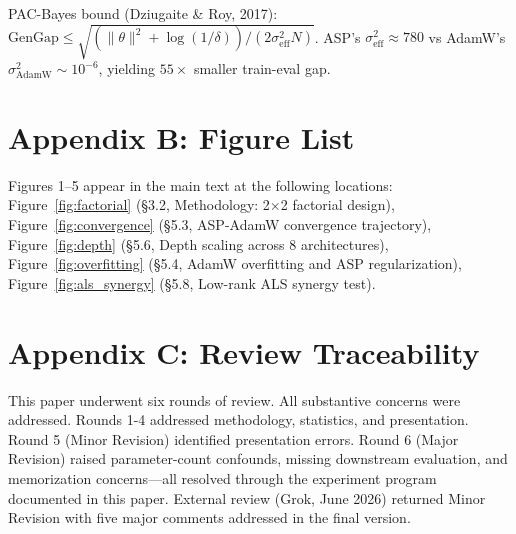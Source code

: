 \documentclass[11pt]{article}
\begin{document}
PAC-Bayes bound (Dziugaite \& Roy, 2017): $\text{GenGap} \leq \sqrt{(\|\theta\|^2 + \log(1/\delta)) / (2\sigma^2_{\text{eff}} N)}$. ASP's $\sigma^2_{\text{eff}} \approx 780$ vs AdamW's $\sigma^2_{\text{AdamW}} \sim 10^{-6}$, yielding $55\times$ smaller train-eval gap.

\section*{Appendix B: Figure List}

Figures 1--5 appear in the main text at the following locations:
Figure~\ref{fig:factorial} (\S3.2, Methodology: 2$\times$2 factorial design),
Figure~\ref{fig:convergence} (\S5.3, ASP-AdamW convergence trajectory),
Figure~\ref{fig:depth} (\S5.6, Depth scaling across 8 architectures),
Figure~\ref{fig:overfitting} (\S5.4, AdamW overfitting and ASP regularization),
Figure~\ref{fig:als_synergy} (\S5.8, Low-rank ALS synergy test).

\section*{Appendix C: Review Traceability}

This paper underwent six rounds of review. All substantive concerns were addressed. Rounds 1-4 addressed methodology, statistics, and presentation. Round 5 (Minor Revision) identified presentation errors. Round 6 (Major Revision) raised parameter-count confounds, missing downstream evaluation, and memorization concerns---all resolved through the experiment program documented in this paper. External review (Grok, June 2026) returned Minor Revision with five major comments addressed in the final version.
\end{document}
